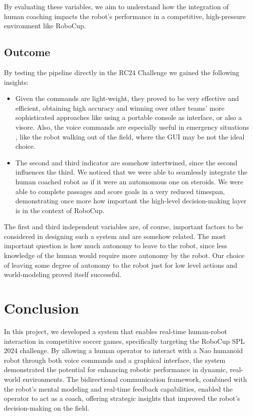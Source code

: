 \documentclass[a4paper, onecolumn, 12pt]{article}
\begin{document}
By evaluating these variables, we aim to understand how the integration of human coaching impacts the robot’s performance in a competitive, high-pressure environment like RoboCup.

\subsection{Outcome}

By testing the pipeline directly in the RC24 Challenge we gained the following insights:
\begin{itemize}
    \item Given the commands are light-weight, they proved to be very effective and efficient, obtaining high accuracy and winning over other teams' more sophisticated approaches like using a portable console as interface, or also a visore. Also, the voice commands are especially useful in emergency situations , like the robot walking out of the field, where the GUI may be not the ideal choice. 
    \item The second and third indicator are somehow intertwined, since the second influences the third. We noticed that we were able to seamlessly integrate the human coached robot as if it were an automomous one on steroids. We were able to complete passages and score goals in a very reduced timespan, demonstrating once more how important the high-level decision-making layer is in the context of RoboCup.
\end{itemize}

The first and third independent variables are, of course, important factors to be considered in designing such a system and are somehow related. The most important question is how much autonomy to leave to the robot, since less knowledge of the human would require more autonomy by the robot. Our choice of leaving some degree of autonomy to the robot just for low level actions and world-modeling proved itself successful.

\section{Conclusion}
\label{sec:con}

In this project, we developed a system that enables real-time human-robot interaction in competitive soccer games, specifically targeting the RoboCup SPL 2024 challenge. By allowing a human operator to interact with a Nao humanoid robot through both voice commands and a graphical interface, the system demonstrated the potential for enhancing robotic performance in dynamic, real-world environments. The bidirectional communication framework, combined with the robot's mental modeling and real-time feedback capabilities, enabled the operator to act as a coach, offering strategic insights that improved the robot's decision-making on the field.
\end{document}
